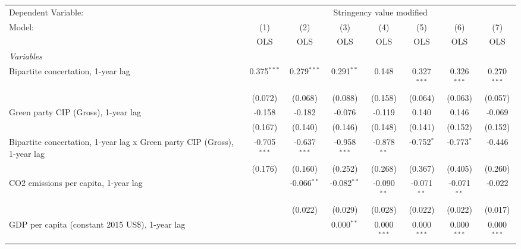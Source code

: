 
\begingroup
\centering
\begin{tabular}{lccccccc}
   \toprule
   Dependent Variable: & \multicolumn{7}{c}{Stringency value modified}\\
   Model:                                                                   & (1)            & (2)            & (3)            & (4)           & (5)           & (6)           & (7)\\  
                                                                            &  OLS           & OLS            & OLS            & OLS           & OLS           & OLS           & OLS\\  
   \midrule
   \emph{Variables}\\
   Bipartite concertation, 1-year lag                                       & 0.375$^{***}$  & 0.279$^{***}$  & 0.291$^{**}$   & 0.148         & 0.327$^{***}$ & 0.326$^{***}$ & 0.270$^{***}$\\   
                                                                            & (0.072)        & (0.068)        & (0.088)        & (0.158)       & (0.064)       & (0.063)       & (0.057)\\   
   Green party CIP (Gross), 1-year lag                                      & -0.158         & -0.182         & -0.076         & -0.119        & 0.140         & 0.146         & -0.069\\   
                                                                            & (0.167)        & (0.140)        & (0.146)        & (0.148)       & (0.141)       & (0.152)       & (0.152)\\   
   Bipartite concertation, 1-year lag x Green party CIP (Gross), 1-year lag & -0.705$^{***}$ & -0.637$^{***}$ & -0.958$^{***}$ & -0.878$^{**}$ & -0.752$^{*}$  & -0.773$^{*}$  & -0.446\\   
                                                                            & (0.176)        & (0.160)        & (0.252)        & (0.268)       & (0.367)       & (0.405)       & (0.260)\\   
   CO2 emissions per capita, 1-year lag                                     &                & -0.066$^{**}$  & -0.082$^{**}$  & -0.090$^{**}$ & -0.071$^{**}$ & -0.071$^{**}$ & -0.022\\   
                                                                            &                & (0.022)        & (0.029)        & (0.028)       & (0.022)       & (0.022)       & (0.017)\\   
   GDP per capita (constant 2015 US\$), 1-year lag                          &                &                & 0.000$^{**}$   & 0.000$^{***}$ & 0.000$^{***}$ & 0.000$^{***}$ & 0.000$^{***}$\\   

\end{tabular}
